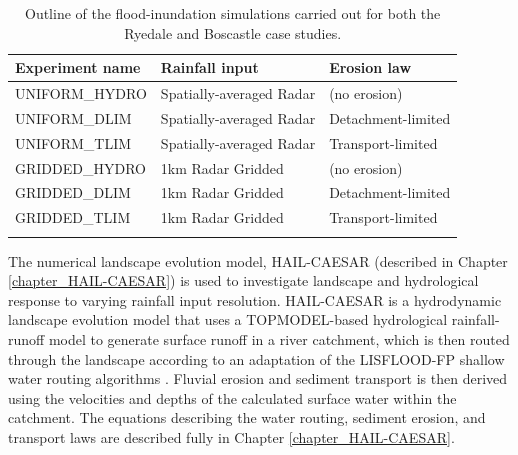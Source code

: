 \begin{table}
\begin{tabular}{lll}
\\
\textbf{Experiment name}   & \textbf{Rainfall input} & \textbf{Erosion law}  \\
\hline
UNIFORM\_HYDRO  &  Spatially-averaged  Radar  & (no erosion) \\
UNIFORM\_DLIM      &  Spatially-averaged  Radar & Detachment-limited \\
UNIFORM\_TLIM       &  Spatially-averaged  Radar & Transport-limited \\

GRIDDED\_HYDRO  &  1km Radar Gridded  & (no erosion) \\
GRIDDED\_DLIM      &  1km Radar Gridded  & Detachment-limited \\
GRIDDED\_TLIM       &  1km Radar Gridded   & Transport-limited \\
\hline \\ 
\end{tabular} 
\caption{Outline of the flood-inundation simulations carried out for both the Ryedale and Boscastle case studies.}
\label{table_ensemble_experiments}
\end{table}

The numerical landscape evolution model, HAIL-CAESAR (described in Chapter \ref{chapter_HAIL-CAESAR}) is used to investigate landscape and hydrological response to varying rainfall input resolution. HAIL-CAESAR is a hydrodynamic landscape evolution model that uses a TOPMODEL-based hydrological rainfall-runoff model to generate surface runoff in a river catchment, which is then routed through the landscape according to an adaptation of the LISFLOOD-FP shallow water routing algorithms \citep{bates2010simple}. Fluvial erosion and sediment transport is then derived using the velocities and depths of the calculated surface water within the catchment. The equations describing the water routing, sediment erosion, and transport laws are described fully in Chapter \ref{chapter_HAIL-CAESAR}.


